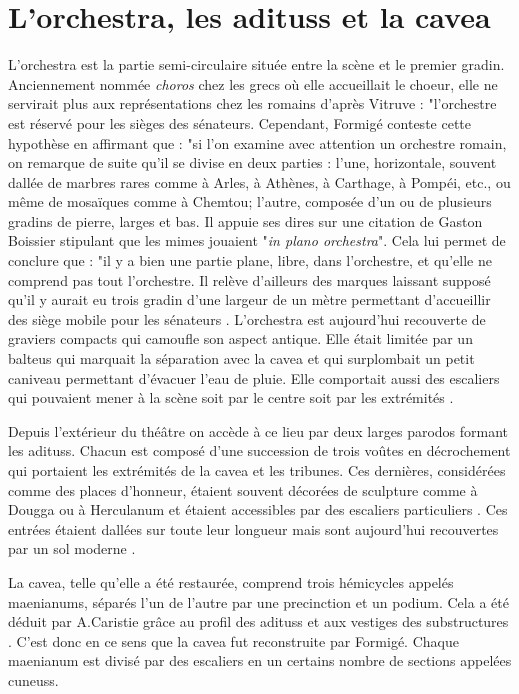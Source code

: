 		
\section{L'\gls{orchestra}, les \glspl{aditus} et la \gls{cavea}}		
	
	L'\gls{orchestra} est la partie semi-circulaire située entre la scène et le premier gradin. Anciennement nommée \textit{choros} chez les grecs où elle accueillait le choeur, elle ne servirait plus aux représentations chez les romains d'après Vitruve \cite[p. 10]{vitruve} : "l'orchestre est réservé pour les sièges des sénateurs. Cependant, Formigé \cite[p. 28-29]{formige} conteste cette hypothèse en affirmant que : "si l'on examine avec attention un orchestre romain, on remarque de suite qu'il se divise en deux parties : l'une, horizontale, souvent dallée de marbres rares comme à Arles, à Athènes, à Carthage, à Pompéi, etc., ou même de mosaïques comme à Chemtou; l'autre, composée d'un ou de plusieurs gradins de pierre, larges et bas. Il appuie ses dires sur une citation de Gaston Boissier \cite[article MIMVS]{boissier} stipulant que les mimes jouaient "\textit{in plano orchestra}". Cela lui permet de conclure que : "il y a bien une partie plane, libre, dans l'orchestre, et qu'elle ne comprend pas tout l'orchestre. Il relève d'ailleurs des marques laissant supposé qu'il y aurait eu trois gradin d'une largeur de un mètre permettant d'accueillir des siège mobile pour les sénateurs \cite[p. 455]{formigeBis}. L'\gls{orchestra} est aujourd'hui recouverte de graviers compacts qui camoufle son aspect antique. Elle était limitée par un \gls{balteus} qui marquait la séparation avec la \gls{cavea} et qui surplombait un petit caniveau permettant d'évacuer l'eau de pluie. Elle comportait aussi des escaliers qui pouvaient mener à la scène soit par le centre soit par les extrémités \citep[p. 52]{formige}.
	
	Depuis l'extérieur du théâtre on accède à ce lieu par deux larges \gls{parodos} formant les \glspl{aditus}. Chacun est composé d'une succession de trois voûtes en décrochement qui portaient les extrémités de la \gls{cavea} et les tribunes. Ces dernières, considérées comme des places d'honneur, étaient souvent décorées de sculpture comme à Dougga ou à Herculanum et étaient accessibles par des escaliers particuliers \citep[p. 37]{formige}. Ces entrées étaient dallées sur toute leur longueur mais sont aujourd'hui recouvertes par un sol moderne \cite[Pl. XVI]{orangePl}.
	
		La  \gls{cavea}, telle qu'elle a été restaurée, comprend trois hémicycles appelés \glspl{maenianum}, séparés l'un de l'autre par une \gls{precinction} et un \gls{podium}. Cela a été déduit par A.Caristie grâce au profil des \glspl{aditus} et aux vestiges des substructures \cite[p. 340]{orangeTxt}. C'est donc en ce sens que la \gls{cavea} fut reconstruite par Formigé. Chaque \gls{maenianum} est divisé par des escaliers en un certains nombre de sections appelées \glspl{cuneus}.
		

